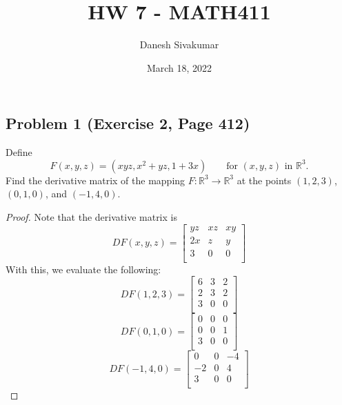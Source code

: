 \documentclass{article}
\title{HW 7 - MATH411}
\author{Danesh Sivakumar}
\date{March 18, 2022}
\begin{document}
\maketitle 


\subsection*{Problem 1 (Exercise 2, Page 412)}
Define 
\[F(x, y, z) = (xyz, x^2 + yz, 1 + 3x) \qquad \text{for $(x, y, z)$ in $\mathbb{R}^3$}.\]
Find the derivative matrix of the mapping $F\colon \mathbb{R}^3 \to \mathbb{R}^3$ at the points $(1, 2, 3)$, $(0, 1, 0)$, and $(-1, 4, 0)$.
\begin{proof}
Note that the derivative matrix is
\[ DF(x, y, z) = \begin{bmatrix}
yz & xz & xy \\
2x & z & y \\
3 & 0 & 0 \\
\end{bmatrix}\]
With this, we evaluate the following:
\[ DF(1, 2, 3) = \begin{bmatrix}
6 & 3 & 2 \\
2 & 3 & 2 \\
3 & 0 & 0 \\
\end{bmatrix}
\]
\[ DF(0, 1, 0) = \begin{bmatrix}
0 & 0 & 0 \\
0 & 0 & 1 \\
3 & 0 & 0 \\
\end{bmatrix}
\]
\[ DF(-1, 4, 0) = \begin{bmatrix}
0 & 0 & -4 \\
-2 & 0 & 4 \\
3 & 0 & 0 \\
\end{bmatrix}
\]

\end{proof}
\end{document}
